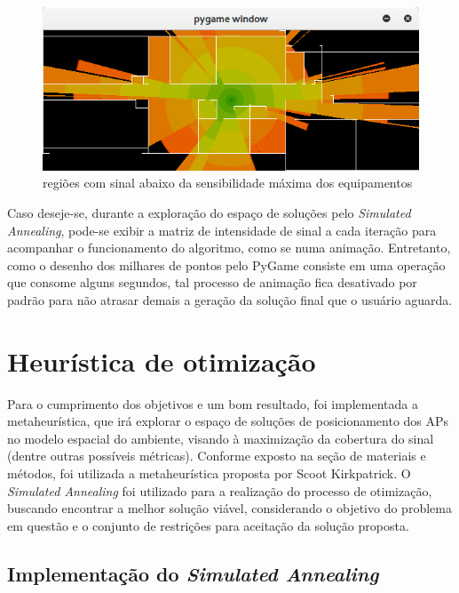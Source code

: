 \documentclass[
	12pt,				%
	openright,			%
	twoside,			%
	a4paper,			%
	english,			%
	french,				%
	spanish,			%
	brazil				%
	]{abntex2}
\begin{document}
\begin{figure}[ht]
	\caption{\label{simulacao_sensibilidade}regiões com sinal abaixo da sensibilidade máxima dos equipamentos}
	\begin{center}
		\includegraphics[scale=0.7]{images/sumulacao-sensibilidade.jpg}
	\end{center}
\end{figure}

Caso deseje-se, durante a exploração do espaço de soluções pelo \textit{Simulated Annealing}, pode-se exibir a matriz de intensidade de sinal a cada iteração para acompanhar o funcionamento do algoritmo, como se numa animação. Entretanto, como o desenho dos milhares de pontos pelo PyGame consiste em uma operação que consome alguns segundos, tal processo de animação fica desativado por padrão para não atrasar demais a geração da solução final que o usuário aguarda. 



\section[Heurística de otimização]{Heurística de otimização}

Para o cumprimento dos objetivos e um bom resultado, foi implementada a metaheurística, que irá explorar o espaço de soluções de posicionamento dos APs no modelo espacial do ambiente, visando à maximização da cobertura do sinal (dentre outras possíveis métricas). Conforme exposto na seção de materiais e métodos, foi utilizada a metaheurística proposta por Scoot Kirkpatrick. O \textit{Simulated Annealing} foi utilizado para a realização do processo de otimização, buscando encontrar a melhor solução viável, considerando o objetivo do problema em questão e o conjunto de restrições para aceitação da solução proposta.

\subsection[Implementação do Simulated Annealing]{Implementação do \textit{Simulated Annealing}}
\end{document}
